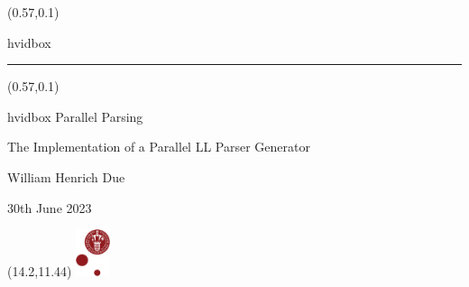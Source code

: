 \documentclass[t,24pt]{beamer}
\begin{document}
{
\begin{frame}
    \begin{textblock*}{\textwidth}(0.57\textwidth,0.1\textheight)
        \begin{beamercolorbox}[wd=6.4cm,ht=7.7cm,sep=0.5cm]{hvidbox}
            \fontsize{4}{10}\selectfont {}
            \noindent\textcolor{KUrod}{\rule{5.4cm}{0.4pt}}
        \end{beamercolorbox}
    \end{textblock*}
    \begin{textblock*}{\textwidth}(0.57\textwidth,0.1\textheight)
        \begin{beamercolorbox}[wd=6.4cm,sep=0.5cm]{hvidbox}
            \Huge \textcolor{KUrod}{Parallel Parsing}
            \vspace{0.5cm}
            \par
            \Large The Implementation of a Parallel LL Parser Generator
            \vspace{0.5cm}
            \par
            \normalsize William Henrich Due
            \vspace{0.1cm}
            \par
            30th June 2023
        \end{beamercolorbox}
    \end{textblock*}
    \begin{textblock}{1}(14.2,11.44)
        \includegraphics[width=1cm]{KU/KU-logo.png}
    \end{textblock}
\end{frame}
}
\end{document}
